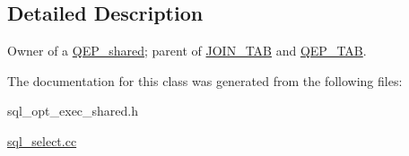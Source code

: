 \subsection{Detailed Description}
Owner of a \mbox{\hyperlink{classQEP__shared}{Q\+E\+P\+\_\+shared}}; parent of \mbox{\hyperlink{classJOIN__TAB}{J\+O\+I\+N\+\_\+\+T\+AB}} and \mbox{\hyperlink{classQEP__TAB}{Q\+E\+P\+\_\+\+T\+AB}}. 

The documentation for this class was generated from the following files\+:\begin{DoxyCompactItemize}
\item 
sql\+\_\+opt\+\_\+exec\+\_\+shared.\+h\item 
\mbox{\hyperlink{sql__select_8cc}{sql\+\_\+select.\+cc}}\end{DoxyCompactItemize}
